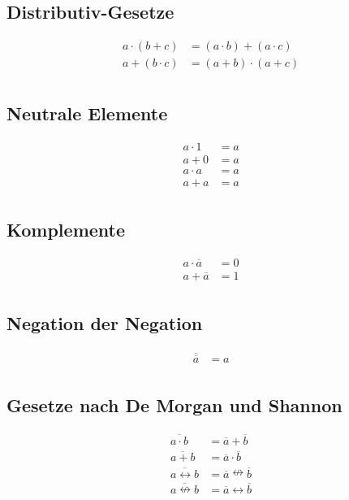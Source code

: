 \documentclass[11pt,a4paper]{scrreprt}
\begin{document}
\subsection*{Distributiv-Gesetze}
\begin{align*}
	a \cdot (b + c) & = (a \cdot b) + (a \cdot c) \\
	a + (b \cdot c) & = (a + b) \cdot (a + c) \\
\end{align*}

\subsection*{Neutrale Elemente}
\begin{align*}
	a \cdot 1 & = a \\
		a + 0 & = a \\
	a \cdot a & = a \\
		a + a & = a \\
\end{align*}

\subsection*{Komplemente}
\begin{align*}
	a \cdot \overline{a} & = 0 \\
		a + \overline{a} & = 1 \\
\end{align*}

\subsection*{Negation der Negation}
\begin{align*}
	\overline{\overline{a}} & = a \\
\end{align*}

\subsection*{Gesetze nach De Morgan und Shannon}
\begin{align*}
	\overline{a \cdot b} & = \overline a + \overline b \\
	\overline{a + b} & = \overline a \cdot \overline b \\
	\overline{a \leftrightarrow b} 
		& = \overline a \nleftrightarrow \overline b \\
	\overline{a \nleftrightarrow b} 
		& = \overline a \leftrightarrow \overline b \\
\end{align*}
\end{document}
